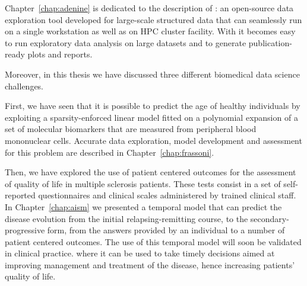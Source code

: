Chapter~\ref{chap:adenine} is dedicated to the description of \ade: an open-source data exploration tool developed for large-scale structured data that can seamlessly run on a single workstation as well as on HPC cluster facility. With \ade it becomes easy to run exploratory data analysis on large datasets and to generate publication-ready plots and reports.

Moreover, in this thesis we have discussed three different biomedical data science challenges.

First, we have seen that it is possible to predict the age of healthy individuals by exploiting a sparsity-enforced linear model fitted on a polynomial expansion of a set of molecular biomarkers that are measured from peripheral blood mononuclear cells.
Accurate data exploration, model development and assessment for this problem are described in Chapter~\ref{chap:frassoni}.

Then, we have explored the use of patient centered outcomes for the assessment of quality of life in multiple sclerosis patients. These tests consist in a set of self-reported questionnaires and clinical scales administered by trained clinical staff.
In Chapter~\ref{chap:aism} we presented a temporal model that can predict the disease evolution from the initial relapsing-remitting course, to the secondary-progressive form, from the answers provided by an individual to a number of patient centered outcomes.
The use of this temporal model will soon be validated in clinical practice. where it can be used to take timely decisions aimed at improving management and treatment of the disease, hence increasing patients' quality of life.

